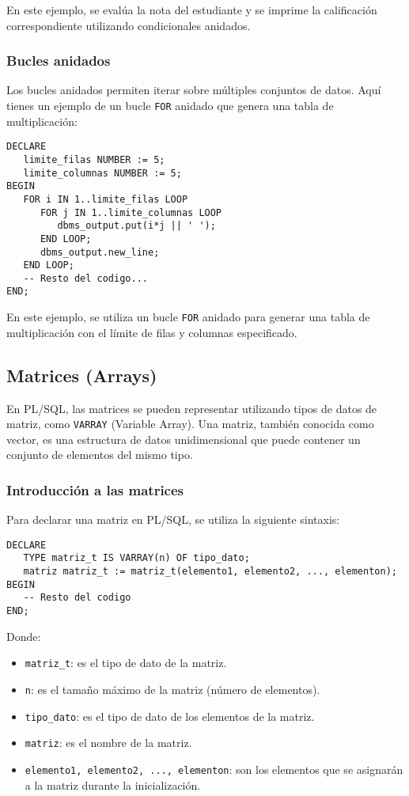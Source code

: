 \documentclass[executivepaper]{article}
\begin{document}
En este ejemplo, se evalúa la nota del estudiante y se imprime la calificación correspondiente utilizando condicionales anidados.

\subsubsection*{Bucles anidados}

Los bucles anidados permiten iterar sobre múltiples conjuntos de datos. Aquí tienes un ejemplo de un bucle \texttt{FOR} anidado que genera una tabla de multiplicación:

\begin{lstlisting}
DECLARE
   limite_filas NUMBER := 5;
   limite_columnas NUMBER := 5;
BEGIN
   FOR i IN 1..limite_filas LOOP
      FOR j IN 1..limite_columnas LOOP
         dbms_output.put(i*j || ' ');
      END LOOP;
      dbms_output.new_line;
   END LOOP;
   -- Resto del codigo...
END;
\end{lstlisting}

En este ejemplo, se utiliza un bucle \texttt{FOR} anidado para generar una tabla de multiplicación con el límite de filas y columnas especificado.

\subsection{Matrices (Arrays)}

En PL/SQL, las matrices se pueden representar utilizando tipos de datos de matriz, como \texttt{VARRAY} (Variable Array). Una matriz, también conocida como vector, es una estructura de datos unidimensional que puede contener un conjunto de elementos del mismo tipo.

\subsubsection*{Introducción a las matrices}

Para declarar una matriz en PL/SQL, se utiliza la siguiente sintaxis:

\begin{lstlisting}
DECLARE
   TYPE matriz_t IS VARRAY(n) OF tipo_dato;
   matriz matriz_t := matriz_t(elemento1, elemento2, ..., elementon);
BEGIN
   -- Resto del codigo
END;
\end{lstlisting}

Donde:
\begin{itemize}
   \item \texttt{matriz\_t}: es el tipo de dato de la matriz.
   \item \texttt{n}: es el tamaño máximo de la matriz (número de elementos).
   \item \texttt{tipo\_dato}: es el tipo de dato de los elementos de la matriz.
   \item \texttt{matriz}: es el nombre de la matriz.
   \item \texttt{elemento1, elemento2, ..., elementon}: son los elementos que se asignarán a la matriz durante la inicialización.
\end{itemize}
\end{document}
